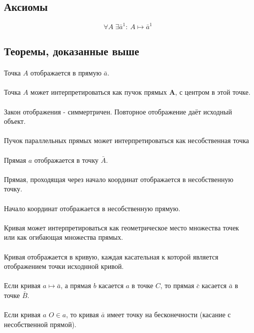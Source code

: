 \subsection{Аксиомы}
$$\forall A \; \exists \bar a^1:\: A \mapsto \bar a^1$$

\subsection{Теоремы, доказанные выше}

\paragraph{} Точка $A$ отображается в прямую $\bar{a}$.
\paragraph{} Точка $A$ может интерпретироваться как пучок прямых $\mathbf{A}$, с центром в этой точке.
\paragraph{} Закон отображения - симмертричен. Повторное отображение даёт исходный объект.
\paragraph{} Пучок параллельных прямых может интерпретироваться как несобственная точка
\paragraph{} Прямая $a$ отображается в точку $\bar{A}$.
\paragraph{} Прямая, проходящая через начало координат отображается в несобственную точку.
\paragraph{} Начало координат отображается в несобственную прямую.
\paragraph{} Кривая может интерпретироваться как геометрическое место множества точек или как огибающая множества прямых.
\paragraph{} Кривая отображается в кривую, каждая касательная к которой является отображением точки исходнной кривой.
\paragraph{} Если кривая $a \mapsto \bar{a}$, а прямая $b$ касается $a$ в точке $C$, то прямая $\bar{c}$ касается $\bar{a}$ в точке $\bar{B}$.
\paragraph{} Если кривая $a$ $O \in a$, то кривая $\bar{a}$ имеет точку на бесконечности (касание с несобственной прямой).